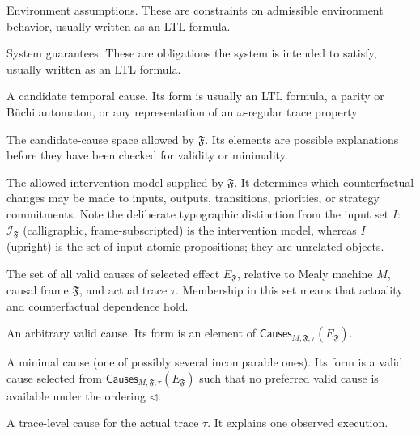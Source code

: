 \documentclass[11pt]{article}
\theoremstyle{remark}
\newcommand{\Frame}{\mathfrak{F}}
\begin{document}
\begin{description}[leftmargin=2.8cm,style=nextline]
  \item[\(A_{\mathrm{env}}\)]
  Environment assumptions. These are constraints on admissible environment
  behavior, usually written as an LTL formula.

  \item[\(G_{\mathrm{sys}}\)]
  System guarantees. These are obligations the system is intended to satisfy,
  usually written as an LTL formula.

  \item[\(C\)]
  A candidate temporal cause. Its form is usually an LTL formula, a parity or
  B\"uchi automaton, or any representation of an \(\omega\)-regular trace
  property.

  \item[\(\mathcal{K}_{\Frame}\)]
  The candidate-cause space allowed by \(\Frame\). Its elements are possible
  explanations before they have been checked for validity or minimality.

  \item[\(\mathcal{I}_{\Frame}\)]
  The allowed intervention model supplied by \(\Frame\). It determines which
  counterfactual changes may be made to inputs, outputs, transitions,
  priorities, or strategy commitments. Note the deliberate typographic
  distinction from the input set \(I\): \(\mathcal{I}_{\Frame}\) (calligraphic,
  frame-subscripted) is the intervention model, whereas \(I\) (upright) is the
  set of input atomic propositions; they are unrelated objects.

  \item[\(\mathsf{Causes}_{M,\Frame,\tau}(E_{\Frame})\)]
  The set of all valid causes of selected effect \(E_{\Frame}\), relative to
  Mealy machine \(M\), causal frame \(\Frame\), and actual trace \(\tau\).
  Membership in this set means that actuality and counterfactual dependence
  hold.

  \item[\(C_{\mathrm{valid}}\)]
  An arbitrary valid cause. Its form is an element of
  \(\mathsf{Causes}_{M,\Frame,\tau}(E_{\Frame})\).

  \item[\(C^\star\)]
  A minimal cause (one of possibly several incomparable ones). Its form is a
  valid cause selected from \(\mathsf{Causes}_{M,\Frame,\tau}(E_{\Frame})\) such
  that no preferred valid cause is available under the ordering \(\triangleleft\).

  \item[\(C_\tau\)]
  A trace-level cause for the actual trace \(\tau\). It explains one observed
  execution.


\end{description}
\end{document}
